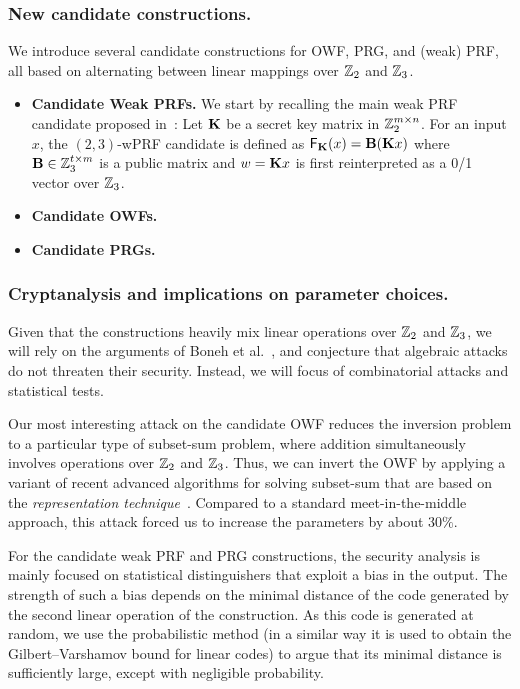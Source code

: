 \fi


\subsubsection{New candidate constructions.}
We introduce several candidate constructions for OWF, PRG, and (weak) PRF, all based on alternating between linear mappings over $\mathbb{Z}_2$ and $\mathbb{Z}_3$.

\begin{itemize}
    \item \textbf{Candidate Weak PRFs.}
    We start by recalling the main weak PRF candidate proposed in~\cite{boneh2018-darkmatter}:
    Let $\mat{K}$ be a secret key matrix in $\mathbb{Z}_2^{m \times n}$. For an input $x$, the $(2,3)$-wPRF candidate is defined as $\mathsf{F}_\mat{K}(x) = \mat{B}(\mat{K}x)$ where $\mat{B} \in \Z_3^{t \times m}$ is a public matrix and $w = \mat{K}x$ is first reinterpreted as a 0/1 vector over $\mathbb{Z}_3$. 


    \item \textbf{Candidate OWFs.} 

    \item \textbf{Candidate PRGs.}
\end{itemize}

\subsubsection{Cryptanalysis and implications on parameter choices.}
Given that the constructions heavily mix linear operations over $\mathbb{Z}_2$ and $\mathbb{Z}_3$,
we will rely on the arguments of Boneh et al.~\cite{boneh2018-darkmatter},
and conjecture that algebraic attacks do not threaten their security.
Instead, we will focus of combinatorial attacks and statistical tests.

Our most interesting attack on the
candidate OWF reduces the inversion problem to a particular type of subset-sum problem,
where addition simultaneously involves operations over $\mathbb{Z}_2$ and $\mathbb{Z}_3$.
Thus, we can invert the OWF by applying a variant of recent advanced algorithms
for solving subset-sum that are based on the
\emph{representation technique}~\cite{Howgrave-GrahamJ10,BeckerCJ11,BonnetainBSS20}.
Compared to a standard meet-in-the-middle approach,
this attack forced us to increase the parameters by about $30\%$.

For the candidate weak PRF and PRG constructions,
the security analysis is mainly focused on
statistical distinguishers that exploit a bias in the output.
The strength of such a bias depends on the minimal distance of the
code generated by the second linear operation of the construction.
As this code is generated at random, we use the probabilistic method
(in a similar way it is used to obtain the Gilbert–Varshamov bound for linear codes)
to argue that its minimal distance is sufficiently large, except with negligible probability.


